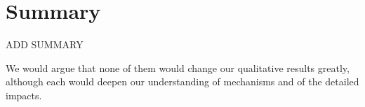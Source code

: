 


\section{Summary}

ADD SUMMARY

We would argue that none of them would change our qualitative results greatly, although each would deepen our understanding of mechanisms and of the detailed impacts.


